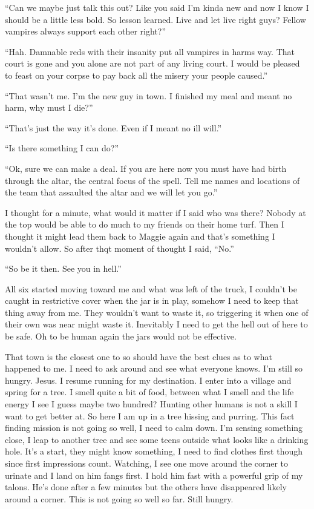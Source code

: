 ``Can we maybe just talk this out? Like you said I'm kinda new and now I know I should be a little less bold. So lesson learned. Live and let live right guys? Fellow vampires always support each other right?''

``Hah. Damnable reds with their insanity put all vampires in harms way. That court is gone and you alone are not part of any living court. I would be pleased to feast on your corpse to pay back all the misery your people caused.''

``That wasn't me. I'm the new guy in town. I finished my meal and meant no harm, why must I die?''

``That's just the way it's done. Even if I meant no ill will.''

``Is there something I can do?''

``Ok, sure we can make a deal. If you are here now you must have had birth through the altar, the central focus of the spell. Tell me names and locations of the team that assaulted the altar and we will let you go.''

I thought for a minute, what would it matter if I said who was there? Nobody at the top would be able to do much to my friends on their home turf. Then I thought it might lead them back to Maggie again and that's something I wouldn't allow. So after thqt moment of thought I said, ``No.''

``So be it then. See you in hell.''

All six started moving toward me and what was left of the truck, I couldn't be caught in restrictive cover when the jar is in play, somehow I need to keep that thing away from me. They wouldn't want to waste it, so triggering it when one of their own was near might waste it. Inevitably I need to get the hell out of here to be safe. Oh to be human again the jars would not be effective.






That town is the closest one to \chichenitza so should have the best clues as to what happened to me. I need to ask around and see what everyone knows. I'm still so  hungry. Jesus. I resume running for my destination. I enter into a village and spring for a tree. I smell quite a bit of food, between what I smell and the life energy I see I guess maybe two hundred? Hunting other humans is not a skill I want to get better at. So here I am up in a tree hissing and purring. This fact finding mission is not going so well, I need to calm down. I'm sensing something close, I leap to another tree and see some teens outside what looks like a drinking hole. It's a start, they might know something, I need to find clothes first though since first impressions count. Watching, I see one move around the corner to urinate and I land on him fangs first. I hold him fast with a powerful grip of my talons. He's done after a few minutes but the others have disappeared likely around a corner. This is not going so well so far. Still hungry. 


